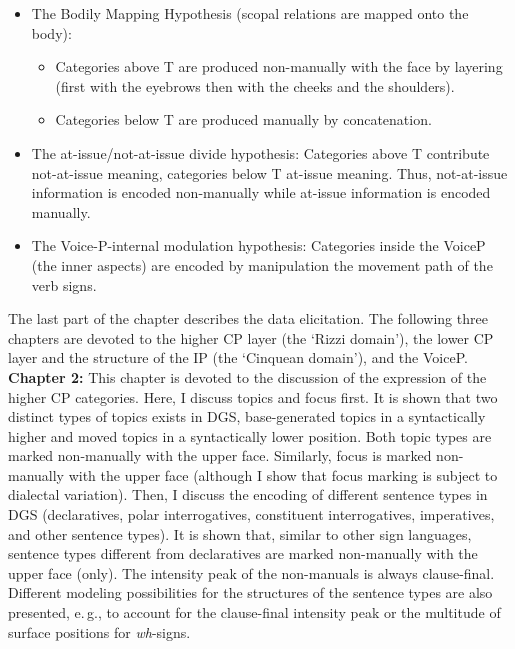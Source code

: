 \documentclass[a4paper,DIV=calc,11pt]{scrartcl}
\begin{document}
\begin{itemize}
	\item The Bodily Mapping Hypothesis (scopal relations are mapped onto the body):
	
	\begin{itemize}
		\item Categories above T are produced non-manually with the face by layering (first with the eyebrows then with the cheeks and the shoulders).
		\item Categories below T are produced manually by concatenation.
	\end{itemize}
	\item The at-issue/not-at-issue divide hypothesis: Categories above T contribute not-at-issue meaning, categories below T at-issue meaning. Thus, not-at-issue information is encoded non-manually while at-issue information is encoded manually.
	\item The Voice-P-internal modulation hypothesis: Categories inside the VoiceP (the inner aspects) are encoded by manipulation the movement path of the verb signs.
\end{itemize}

\noindent The last part of the chapter describes the data elicitation. The following three chapters are devoted to the higher CP layer (the `Rizzi domain'), the lower CP layer and the structure of the IP (the `Cinquean domain'), and the VoiceP.\\

\noindent \textbf{Chapter 2:} This chapter is devoted to the discussion of the expression of the higher CP categories. Here, I discuss topics and focus first. It is shown that two distinct types of topics exists in DGS, base-generated topics in a syntactically higher and moved topics in a syntactically lower position. Both topic types are marked non-manually with the upper face. Similarly, focus is marked non-manually with the upper face (although I show that focus marking is subject to dialectal variation). Then, I discuss the encoding of different sentence types in DGS (declaratives, polar interrogatives, constituent interrogatives, imperatives, and other sentence types).  It is shown that, similar to other sign languages, sentence types different from declaratives are marked non-manually with the upper face (only). The intensity peak of the non-manuals is always clause-final. Different modeling possibilities for the structures of the sentence types are also presented, e.\,g., to account for the clause-final intensity peak or the multitude of surface positions for \textit{wh}-signs.\\
\end{document}
